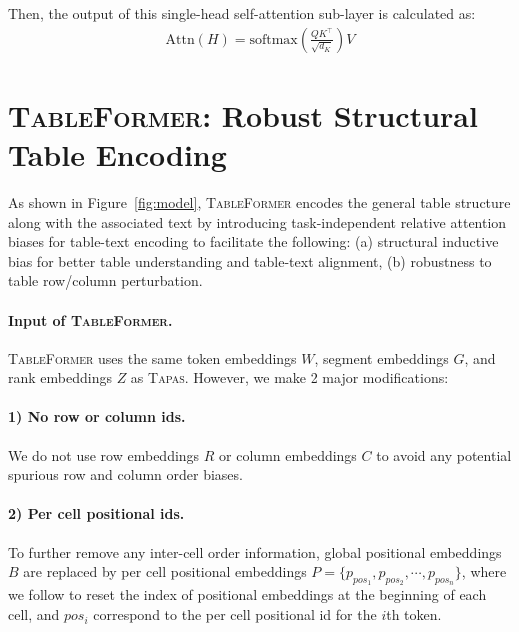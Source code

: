 \documentclass[11pt]{article}
\newcommand{\su}[1]{{\color{blue} SU: #1}}
\newcommand{\jy}[1]{{\color{red} JY: #1}}
\begin{document}
Then, the output of this single-head self-attention sub-layer is calculated as: 
\begin{equation}
\label{eqatt}
\begin{aligned}
\text{Attn}(H) = \text{softmax} (\frac{QK^\top}{\sqrt{d_K}})V
\end{aligned}
\end{equation}


\section{\textsc{TableFormer}: Robust Structural Table Encoding}


As shown in Figure~\ref{fig:model}, \textsc{TableFormer} encodes the general table structure along with the associated text by introducing task-independent relative attention biases for table-text encoding to facilitate the following:  (a) structural inductive bias for better table understanding and table-text alignment, (b) robustness to table row/column perturbation. %

\paragraph{Input of \textsc{TableFormer}.}
\label{sec:input}


\textsc{TableFormer} uses the same token embeddings $W$, segment embeddings $G$, and rank embeddings $Z$ as \textsc{Tapas}. However, we make 2 major modifications:
\paragraph{1) No row or column ids.} We do not use row embeddings $R$ or column embeddings $C$ to avoid any potential spurious row and column order biases.
\paragraph{2) Per cell positional ids.} To further remove any inter-cell order information, global positional embeddings $B$ are replaced by per cell positional embeddings $P = \{p_{pos_1}, p_{pos_2}, \cdots, p_{pos_n}\}$, where we follow \citet{eisenschlos2021mate} to reset the index of positional embeddings at the beginning of each cell, and $pos_i$ correspond to the per cell positional id for the $i$th token. 
\end{document}
